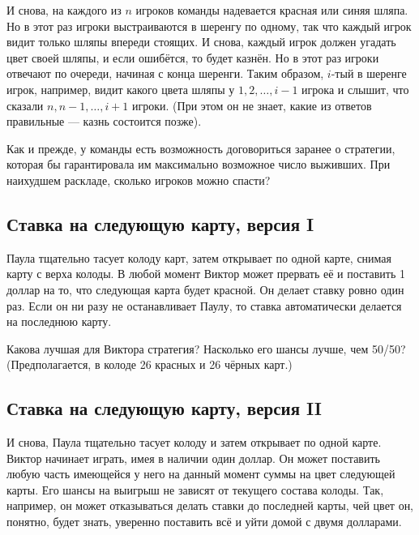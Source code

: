 И снова, на каждого из $n$ игроков команды надевается красная или синяя шляпа.
Но в этот раз игроки выстраиваются в шеренгу по одному, так что каждый игрок видит только шляпы впереди стоящих.
И снова, каждый игрок должен угадать цвет своей шляпы, и  если ошибётся, то будет казнён.
Но в этот раз игроки отвечают по очереди, начиная с конца шеренги.
Таким образом, $i$-тый в шеренге игрок, например, видит какого цвета шляпы у $1, 2,\dots, i-1$ игрока и слышит, что сказали $n, n-1,\dots, i+1$ игроки.
(При этом он не знает, какие из ответов правильные --- казнь состоится позже).

\medskip

Как и прежде, у команды есть возможность договориться заранее о стратегии, которая бы гарантировала им максимально возможное число выживших.
При наихудшем раскладе, сколько игроков можно спасти?

\subsection*{Ставка на следующую карту, версия I} %

Паула тщательно тасует колоду карт, затем открывает по одной карте, снимая карту с верха колоды.
В любой момент Виктор может прервать её и поставить 1 доллар на то, что следующая карта будет красной.
Он делает ставку ровно один раз.
Если он ни разу не останавливает Паулу, то ставка автоматически делается на последнюю карту.

\medskip

Какова лучшая для Виктора стратегия?
Насколько его шансы лучше, чем 50/50? 
(Предполагается, в колоде 26 красных и 26 чёрных карт.)

\subsection*{Ставка на следующую карту, версия II} %

И снова, Паула тщательно тасует колоду и затем открывает по одной карте.
Виктор начинает играть, имея в наличии один доллар.
Он может поставить  любую часть имеющейся у него на данный момент суммы на цвет следующей карты.
Его шансы на выигрыш не зависят от текущего состава колоды.
Так, например, он может отказываться делать ставки до последней карты, чей цвет он, понятно, будет знать, уверенно поставить всё и уйти домой с двумя долларами.

